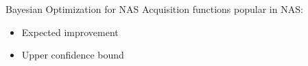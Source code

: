 \documentclass[main]{subfiles}
\begin{document}
\begin{frame}{Bayesian Optimization for NAS}
Acquisition functions popular in NAS:
\begin{itemize}
    \item Expected improvement 
    \item Upper confidence bound~ 
\end{itemize}
\end{frame}
\end{document}
